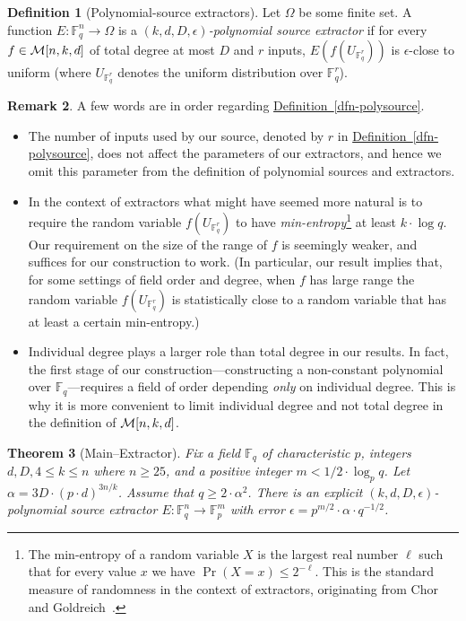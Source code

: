 \documentclass[10pt]{article}
\newtheorem{theorem}{Theorem}[section]
\theoremstyle{definition}
\newtheorem{definition}[theorem]{Definition}
\newtheorem{remark}[theorem]{Remark}
\numberwithin{equation}{section}
\newcommand{\expref}[2]{\texorpdfstring{\hyperref[#2]{#1~\ref{#2}}}{#1~\ref{#2}}}
\newcommand{\eps}{\epsilon}
\newcommand{\polyext}[4]{$(#1,#2,#3,#4)$-polynomial source extractor}
\newcommand{\F}{\mathbb F_q}
\newcommand{\M}[3]{{\cal M}[#1,#2,#3]}
\begin{document}
%
%
\begin{definition}[Polynomial-source extractors]\label{dfn-polyext}
%
Let $\Omega$ be some finite set.
A function $E:\F^n\to \Omega$  is a \emph{\polyext{k}{d}{D}{\eps}} if for
every $f\in \M{n}{k}{d}$ of total degree at most $D$ and $r$ inputs,
$E(f(U_{\F^r}))$ is $\eps$-close to uniform
(where $U_{\F^r}$ denotes the uniform distribution
%
over $\F^r$).
%
%
%
%
%
\end{definition}
\begin{remark}
A few words are in order regarding \expref{Definition}{dfn-polysource}.
\begin{itemize}
\item
%
%
%
 The number of inputs used by our source, denoted by $r$ in
 \expref{Definition}{dfn-polysource}, does not affect the
%
%
parameters of our extractors, and hence
%
we omit this parameter from the definition of
polynomial sources and extractors.

\item In the context of extractors what might have seemed
more natural is to require the
%
%
%
%
random variable
$f(U_{\F^r})$ to have
\emph{min-entropy}\footnote{The min-entropy of a
%
%
%
random variable $X$ is
the largest %
real number $\ell$
such that for every
%
value $x$
we have %
%
%
%
$\Pr(X=x)\leq 2^{-{\ell}}$.
This is the standard measure of randomness in the context of extractors,
%
originating from Chor and Goldreich~\cite{CG88}.}
at least $k\cdot \log q$.
%
%
%
Our requirement on the size of the range of $f$ is seemingly weaker,
and suffices for our construction to work.
%
%
%
%
(In particular, our result implies that, for some settings of field order and degree, when $f$ has large range
the random variable $f(U_{\F^r})$ is statistically close to a random variable that has at least a certain min-entropy.)

\item Individual degree plays a larger role than total degree in our results.
%
  In fact, the first stage of our construction---constructing a
%
%
  non-constant polynomial over $\F$---requires a field of order
%
  depending \emph{only} on individual degree. This is why it is
  more convenient to limit individual degree and not total degree
  in the definition of $\M{n}{k}{d}$.

\end{itemize}
\end{remark}
\setcounter{theorem}{4}
\begin{theorem}[Main--Extractor]\label{thm-ext_main_intro}
Fix a field $\F$ of characteristic $p$, integers $d,D,4\leq k\leq n$ where $n\geq 25$,
and a positive integer $m<1/2\cdot \log_p q$.
Let $\alpha=3 D \cdot (p\cdot d)^{3 n/k} $. Assume that   $q\geq 2\cdot  \alpha^2$.
There is an explicit \polyext{k}{d}{D}{\eps}  $E:\F^n\to \mathbb{F}_p^m$ with error
$\eps =  p^{m/2}\cdot \alpha \cdot q^{-1/2}$.
\end{theorem}
\setcounter{section}{1}
\end{document}
